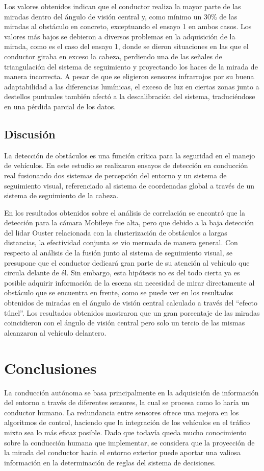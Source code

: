 Los valores obtenidos indican que el conductor realiza la mayor parte de las miradas dentro del ángulo de visión central y, como mínimo un 30\% de las miradas al obstáculo en concreto, exceptuando el ensayo 1 en ambos casos. Los valores más bajos se debieron a diversos problemas en la adquisición de la mirada, como es el caso del ensayo 1, donde se dieron situaciones en las que el conductor giraba en exceso la cabeza, perdiendo una de las señales de triangulación del sistema de seguimiento y proyectando los haces de la mirada de manera incorrecta. A pesar de que se eligieron sensores infrarrojos por su buena adaptabilidad a las diferencias lumínicas, el exceso de luz en ciertas zonas junto a destellos puntuales también afectó a la descalibración del sistema, traduciéndose en una pérdida parcial de los datos.

\subsection{Discusión}\label{443}
La detección de obstáculos es una función crítica para la seguridad en el manejo de vehículos. En este estudio se realizaron ensayos de detección en conducción real fusionando dos sistemas de percepción del entorno y un sistema de seguimiento visual, referenciado al sistema de coordenadas global a través de un sistema de seguimiento de la cabeza.

En los resultados obtenidos sobre el análisis de correlación se encontró que la detección para la cámara Mobileye fue alta, pero que debido a la baja detección del \gls{lidar} Ouster relacionada con la clusterización de obstáculos a largas distancias, la efectividad conjunta se vio mermada de manera general. Con respecto al análisis de la fusión junto al sistema de seguimiento visual, se presupone que el conductor dedicará gran parte de su atención al vehículo que circula delante de él. Sin embargo, esta hipótesis no es del todo cierta ya es posible adquirir información de la escena sin necesidad de mirar directamente al obstáculo que se encuentra en frente, como se puede ver en los resultados obtenidos de miradas en el ángulo de visión central calculado a través del “efecto túnel”. Los resultados obtenidos mostraron que un gran porcentaje de las miradas coincidieron con el ángulo de visión central pero solo un tercio de las mismas alcanzaron al vehículo delantero. 

\section{Conclusiones}\label{45}
La conducción autónoma se basa principalmente en la adquisición de información del entorno a través de diferentes sensores, la cual se procesa como lo haría un conductor humano. La redundancia entre sensores ofrece una mejora en los algoritmos de control, haciendo que la integración de los vehículos en el tráfico mixto sea lo más eficaz posible. Dado que todavía queda mucho conocimiento sobre la conducción humana que implementar, se considera que la proyección de la mirada del conductor hacia el entorno exterior puede aportar una valiosa información en la determinación de reglas del sistema de decisiones.

